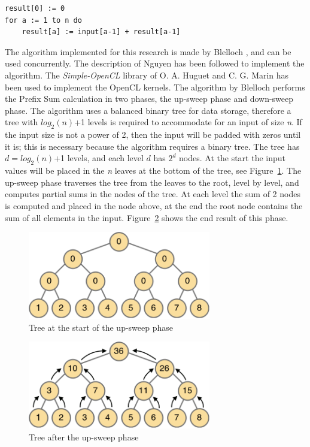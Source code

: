 \documentclass[a4paper]{article}
\begin{document}
\begin{lstlisting}[caption=Single thread Prefix Sum, label=singleThreadAlgorithm, float=htpb]
result[0] := 0
for a := 1 to n do  
	result[a] := input[a-1] + result[a-1]
\end{lstlisting}

The algorithm implemented for this research is made by Blelloch \cite{Blelloch:PrefixSumApplications}, and can be used concurrently. The description of Nguyen \cite{Nguyen:GPUGems3} has been followed to implement the algorithm. The \emph{Simple-OpenCL} library \cite{Huguet:SimpleCL} of O. A. Huguet and C. G. Marin has been used to implement the OpenCL kernels. The algorithm by Blelloch performs the Prefix Sum calculation in two phases, the up-sweep phase and down-sweep phase. The algorithm uses a balanced binary tree for data storage, therefore a tree with $log_2(n)$+1 levels is required to accommodate for an input of size \emph{n}. If the input size is not a power of 2, then the input will be padded with zeros until it is; this is necessary because the algorithm requires a binary tree. The tree has $d=log_2(n)$+1 levels, and each level $d$ has $2^d$ nodes. At the start the input values will be placed in the \emph{n} leaves at the bottom of the tree, see Figure~\ref{treeStart}. The up-sweep phase traverses the tree from the leaves to the root, level by level, and computes partial sums in the nodes of the tree. At each level the sum of 2 nodes is computed and placed in the node above, at the end the root node contains the sum of all elements in the input. Figure~\ref{treeUpSweep} shows the end result of this phase.

\begin{figure}[htb!]
	\centering
	\includegraphics[width=80mm]{../images/tree-start.png}
	\caption{Tree at the start of the up-sweep phase}
	\label{treeStart}
\end{figure}

\begin{figure}[htb!]
	\centering
	\includegraphics[width=80mm]{../images/tree-upsweep.png}
	\caption{Tree after the up-sweep phase}
	\label{treeUpSweep}
\end{figure}
\end{document}
